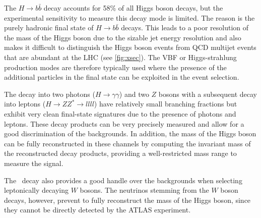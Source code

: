 The $H\rightarrow b\bar{b}$ decay accounts for 58\% of all Higgs boson decays, but the experimental sensitivity to measure this decay mode is limited. The reason is the purely hadronic final state of $H\rightarrow b\bar{b}$ decays. 
This leads to a poor resolution of the mass of the Higgs boson due to the sizable jet energy resolution and also makes it difficult to distinguish the Higgs boson events from QCD multijet events that are abundant at the LHC (see \cref{fig:xsec}).
The VBF or Higgs-strahlung production modes are therefore typically used where the presence of the additional particles in the final state can be exploited in the event selection.

The decay into two photons ($H \to \gamma\gamma$) and two $Z$ bosons with a subsequent decay into leptons ($H \to ZZ^* \to llll$) have relatively small branching fractions but exhibit very clean final-state signatures due to the presence of photons and leptons. These decay products can be very precisely measured and allow for a good discrimination of the backgrounds.
In addition, the mass of the Higgs boson can be fully reconstructed in these channels by computing the invariant mass of the reconstructed decay products, providing a well-restricted mass range to measure the signal.

The \HWW\ decay also provides a good handle over the backgrounds when selecting leptonically decaying $W$ bosons.
The neutrinos stemming from the $W$ boson decays, however, prevent to fully reconstruct the mass of the Higgs boson, since they cannot be directly detected by the ATLAS experiment.

